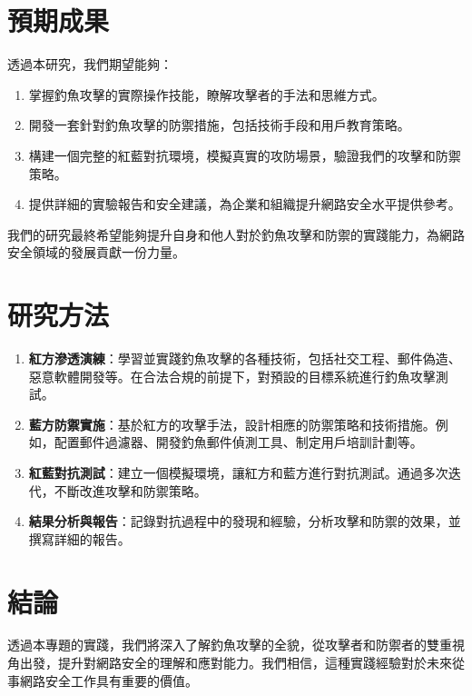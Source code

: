 \documentclass[a4paper,12pt]{article}
\begin{document}
\section{預期成果}
透過本研究，我們期望能夠：

\begin{enumerate}
  \item 掌握釣魚攻擊的實際操作技能，瞭解攻擊者的手法和思維方式。
  \item 開發一套針對釣魚攻擊的防禦措施，包括技術手段和用戶教育策略。
  \item 構建一個完整的紅藍對抗環境，模擬真實的攻防場景，驗證我們的攻擊和防禦策略。
  \item 提供詳細的實驗報告和安全建議，為企業和組織提升網路安全水平提供參考。
\end{enumerate}

我們的研究最終希望能夠提升自身和他人對於釣魚攻擊和防禦的實踐能力，為網路安全領域的發展貢獻一份力量。

\section{研究方法}
\begin{enumerate}
  \item \textbf{紅方滲透演練}：學習並實踐釣魚攻擊的各種技術，包括社交工程、郵件偽造、惡意軟體開發等。在合法合規的前提下，對預設的目標系統進行釣魚攻擊測試。
  \item \textbf{藍方防禦實施}：基於紅方的攻擊手法，設計相應的防禦策略和技術措施。例如，配置郵件過濾器、開發釣魚郵件偵測工具、制定用戶培訓計劃等。
  \item \textbf{紅藍對抗測試}：建立一個模擬環境，讓紅方和藍方進行對抗測試。通過多次迭代，不斷改進攻擊和防禦策略。
  \item \textbf{結果分析與報告}：記錄對抗過程中的發現和經驗，分析攻擊和防禦的效果，並撰寫詳細的報告。
\end{enumerate}


\section{結論}
透過本專題的實踐，我們將深入了解釣魚攻擊的全貌，從攻擊者和防禦者的雙重視角出發，提升對網路安全的理解和應對能力。我們相信，這種實踐經驗對於未來從事網路安全工作具有重要的價值。

\end{document}
